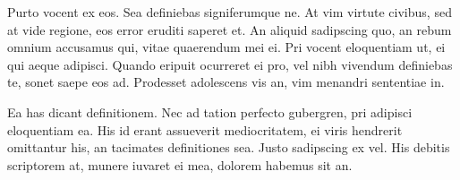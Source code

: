 \documentclass[12pt,a4paper]{article}
\begin{document}
\begin{multicols}{2}
        
        
        
        Purto vocent ex eos. Sea definiebas signiferumque ne. At vim virtute civibus, sed at vide regione, eos error eruditi saperet et. An aliquid sadipscing quo, an rebum omnium accusamus qui, vitae quaerendum mei ei. Pri vocent eloquentiam ut, ei qui aeque adipisci. Quando eripuit ocurreret ei pro, vel nibh vivendum definiebas te, sonet saepe eos ad. Prodesset adolescens vis an, vim menandri sententiae in.
        
        Ea has dicant definitionem. Nec ad tation perfecto gubergren, pri adipisci eloquentiam ea. His id erant assueverit mediocritatem, ei viris hendrerit omittantur his, an tacimates definitiones sea. Justo sadipscing ex vel. His debitis scriptorem at, munere iuvaret ei mea, dolorem habemus sit an.
    \end{multicols}
\end{document}
